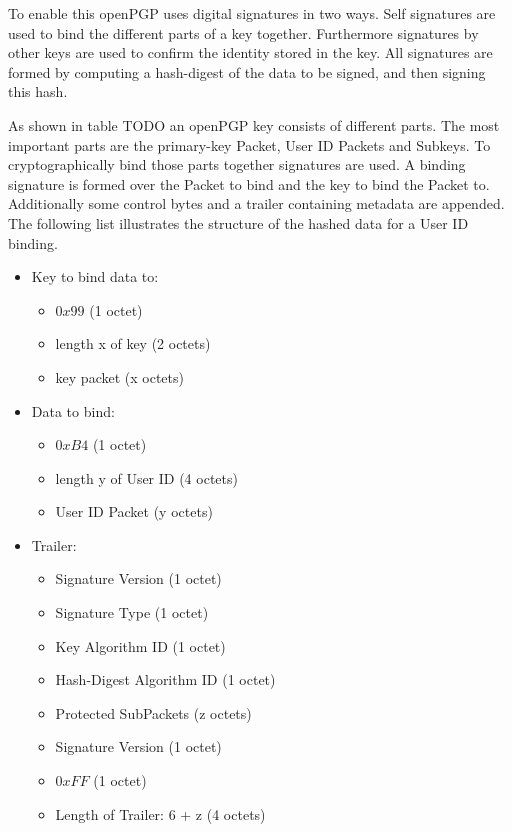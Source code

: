 To enable this openPGP uses digital signatures in two ways. Self signatures are used to bind the different parts of a key together. Furthermore signatures by other keys are used to confirm the identity stored in the key. All signatures are formed by computing a hash-digest of the data to be signed, and then signing this hash.

As shown in table TODO an openPGP key consists of different parts. The most important parts are the primary-key Packet, User ID Packets and Subkeys. To cryptographically bind those parts together signatures are used. A binding signature is formed over the Packet to bind and the key to bind the Packet to. Additionally some control bytes and a trailer containing metadata are appended.  \\

The following list illustrates the structure of the hashed data for a User ID binding.

\begin{itemize}
	\item Key to bind data to:
	\begin{itemize}
		\item $0x99$ (1 octet)
		\item length x of key (2 octets)
		\item key packet (x octets)
	\end{itemize}
	
	\item Data to bind:
	\begin{itemize}
		\item $0xB4$ (1 octet)
		\item length y of User ID (4 octets)
		\item User ID Packet (y octets)
	\end{itemize}
	
	\item Trailer:
	\begin{itemize}
		\item Signature Version (1 octet)
		\item Signature Type (1 octet)
		\item Key Algorithm ID (1 octet)
		\item Hash-Digest Algorithm ID (1 octet)
		\item Protected SubPackets (z octets)
		\item Signature Version (1 octet) 
		\item $0xFF$ (1 octet)
		\item Length of Trailer: 6 + z (4 octets)
	\end{itemize}
\end{itemize}

